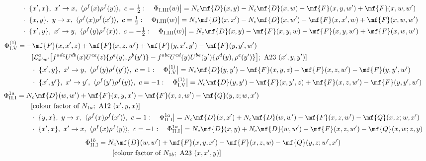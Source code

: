 {\begin{align}
&\qquad\cdot\ \{x',x\},\ x'\to x,\ \langle\rho^{f}(x)\rho^{f}(y)\rangle,\ c=\tfrac{1}{2}:\quad \Phi_{\rm I.III}(w)\big|=N_{c}\mf{D}(x,y)-N_{c}\mf{D}(x,w)-\mf{F}(x,y,w')+\mf{F}(x,w,w')\notag\\
&\qquad\cdot\ \{x,y\},\ y\to x,\ \langle\rho^{f}(x)\rho^{f}(x')\rangle,\ c=\tfrac{1}{2}:\quad \Phi_{\rm I.III}(w)\big|=N_{c}\mf{D}(x,x')-N_{c}\mf{D}(x,w')-\mf{F}(x,x',w)+\mf{F}(x,w,w')\notag\\
&\qquad\cdot\ \{x',y\},\ x'\to y,\ \langle\rho^{f}(y)\rho^{f}(x)\rangle,\ c=-\tfrac{1}{2}:\quad \Phi_{\rm I.III}(w)\big|=N_{c}\mf{D}(x,y)-\mf{F}(x,y,w)-\mf{F}(x,y,w')+\mf{F}(x,w,w')\notag
\end{align}
\begin{align}
\Phi_{\rm I.V}^{(1)}&=-\mf{F}(x,x',z)+\mf{F}(x,z,w')+\mf{F}(y,x',y')-\mf{F}(y,y',w')\notag\\&\qquad[\mathcal{L}^{a}_{x'w'}\big[f^{adc}U^{db}(x)U^{ce}(z)\{\rho^{e}(y),\rho^{b}(y')\}-f^{abc}U^{cd}(y)U^{be}(y')\{\rho^{d}(y),\rho^{e}(y')\}\big];\ \text{A23}\ (x',y,y')]\notag\\
&\qquad\cdot\ \{x',y\},\ x'\to y,\ \langle\rho^{f}(y)\rho^{f}(y')\rangle,\ c=1:\quad \Phi_{\rm I.V}^{(1)}\big|=N_{c}\mf{D}(y,y')-\mf{F}(x,y,z)+\mf{F}(x,z,w')-\mf{F}(y,y',w')\notag\\
&\qquad\cdot\ \{x',y'\},\ x'\to y',\ \langle\rho^{f}(y')\rho^{f}(y)\rangle,\ c=-1:\quad \Phi_{\rm I.V}^{(1)}\big|=N_{c}\mf{D}(y,y')-\mf{F}(x,y',z)+\mf{F}(x,z,w')-\mf{F}(y,y',w')\notag
\end{align}
\begin{align}
\Phi_{\rm II.I}^{1a}&=N_{c}\mf{D}(w,w')+\mf{F}(x,y,x')-\mf{F}(x,z,w')-\mf{Q}(y,z;w,x')\notag\\&\qquad[\text{colour factor of }N_{1a};\ \text{A12}\ (x',y,x)]\notag\\
&\qquad\cdot\ \{y,x\},\ y\to x,\ \langle\rho^{f}(x)\rho^{f}(x')\rangle,\ c=1:\quad \Phi_{\rm II.I}^{1a}\big|=N_{c}\mf{D}(x,x')+N_{c}\mf{D}(w,w')-\mf{F}(x,z,w')-\mf{Q}(x,z;w,x')\notag\\
&\qquad\cdot\ \{x',x\},\ x'\to x,\ \langle\rho^{f}(x)\rho^{f}(y)\rangle,\ c=-1:\quad \Phi_{\rm II.I}^{1a}\big|=N_{c}\mf{D}(x,y)+N_{c}\mf{D}(w,w')-\mf{F}(x,z,w')-\mf{Q}(x,w;z,y)\notag
\end{align}
\begin{align}
\Phi_{\rm II.I}^{1b}&=N_{c}\mf{D}(w,w')+\mf{F}(x,y,x')-\mf{F}(x,z,w)-\mf{Q}(y,z;w',x')\notag\\&\qquad[\text{colour factor of }N_{1b};\ \text{A23}\ (x,x',y)]\notag\\

\end{align}}
